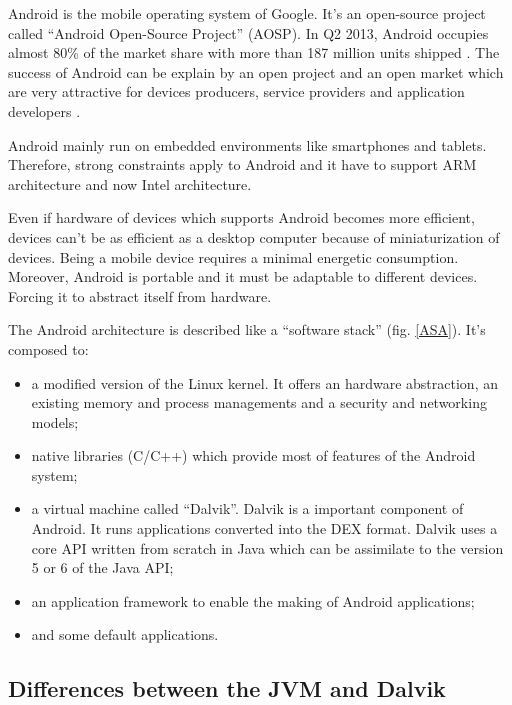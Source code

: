 \documentclass{sigplanconf}
\def \DALVIK{\mbox{Dalvik}\xspace}
\def \ANDROID{\mbox{Android}\xspace}
\def \DEX{\mbox{DEX}\xspace}
\begin{document}
    \ANDROID is the mobile operating system of Google.
    It's an open-source project called ``\ANDROID Open-Source Project'' (AOSP).
    In Q2 2013, \ANDROID occupies almost 80\% of the market share with more than 187 million units shipped \cite{idc-website}.
    The success of \ANDROID can be explain by an open project and an open market
    which are very attractive for devices producers, service providers and application developers \cite{ieee-butler-android-landscape}.

    \ANDROID mainly run on embedded environments like smartphones and tablets.
    Therefore, strong constraints apply to \ANDROID
    and it have to support ARM architecture and now Intel architecture.
    
    Even if hardware of devices which supports \ANDROID becomes more efficient,
    devices can't be as efficient as a desktop computer because of miniaturization of devices.
    Being a mobile device requires a minimal energetic consumption.
    Moreover, \ANDROID is portable and it must be adaptable to different devices.
    Forcing it to abstract itself from hardware.

    The \ANDROID architecture is described like a ``software stack'' (fig. \ref{ASA}).
    It's composed to:
    \begin{itemize}
      \item a modified version of the Linux kernel.
        It offers an hardware abstraction,
        an existing memory and process managements
        and a security and networking models;
      \item native libraries (C/C++)
        which provide most of features of the \ANDROID system;
      \item a virtual machine called ``\DALVIK''. \DALVIK is a important component of \ANDROID.
        It runs applications converted into the \DEX format.
        \DALVIK uses a core API written from scratch in Java
        which can be assimilate to the version 5 or 6 of the Java API;
      \item an application framework to enable the making of \ANDROID applications;
      \item and some default applications.
    \end{itemize}

    \subsection{Differences between the JVM and Dalvik}
\end{document}
